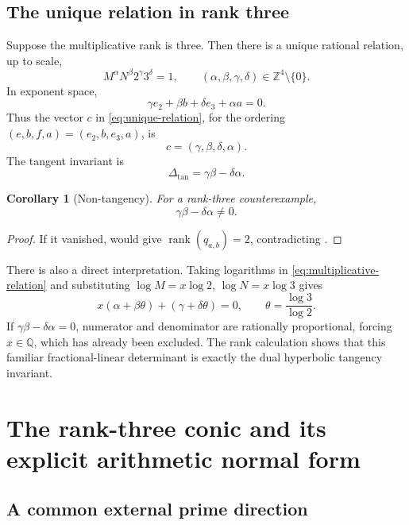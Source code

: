 \documentclass[11pt]{article}
\newtheorem{corollary}[theorem]{Corollary}
\theoremstyle{definition}
\theoremstyle{remark}
\newcommand{\Q}{\mathbb{Q}}
\newcommand{\Z}{\mathbb{Z}}
\newcommand{\rank}{\operatorname{rank}}
\begin{document}
\subsection{The unique relation in rank three}

Suppose the multiplicative rank is three.  Then there is a unique rational relation, up to
scale,
\begin{equation}
 M^{\alpha}N^{\beta}2^{\gamma}3^{\delta}=1,
 \qquad
 (\alpha,\beta,\gamma,\delta)\in\Z^4\setminus\{0\}.
 \label{eq:multiplicative-relation}
\end{equation}
In exponent space,
\[
 \gamma e_2+\beta b+\delta e_3+\alpha a=0.
\]
Thus the vector $c$ in \eqref{eq:unique-relation}, for the ordering
$(e,b,f,a)=(e_2,b,e_3,a)$, is
\[
 c=(\gamma,\beta,\delta,\alpha).
\]
The tangent invariant is
\begin{equation}
 \Delta_{\mathrm{tan}}=\gamma\beta-\delta\alpha.
 \label{eq:det-invariant}
\end{equation}

\begin{corollary}[Non-tangency]
\label{cor:non-tangency}
For a rank-three counterexample,
\[
 \gamma\beta-\delta\alpha\ne0.
\]
\end{corollary}

\begin{proof}
If it vanished,  would give
$\rank(q_{a,b})=2$, contradicting .
\end{proof}

There is also a direct interpretation.  Taking logarithms in
\eqref{eq:multiplicative-relation} and substituting
$\log M=x\log2$, $\log N=x\log3$ gives
\[
 x(\alpha+\beta\theta)+(\gamma+\delta\theta)=0,
 \qquad \theta=\frac{\log3}{\log2}.
\]
If $\gamma\beta-\delta\alpha=0$, numerator and denominator are rationally proportional,
forcing $x\in\Q$, which has already been excluded.  The rank calculation shows that this
familiar fractional-linear determinant is exactly the dual hyperbolic tangency invariant.

\section{The rank-three conic and its explicit arithmetic normal form}
\label{sec:rank-three-conic}

\subsection{A common external prime direction}
\end{document}
